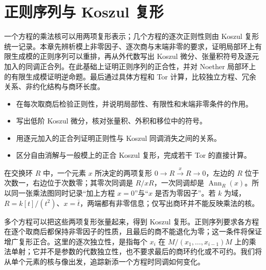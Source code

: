 
\chapter{正则序列与 Koszul 复形}
\label{b3:ch:15}

\begin{chapterabstract}
	一个方程的乘法核可以用两项复形表示；几个方程的逐次正则性则由 Koszul 复形统一记录。本章先辨析模上非零因子、逐次商与末端非零的要求，证明局部环上有限生成模的正则序列可以重排，再从外代数写出 Koszul 微分、张量积符号及逐元加入的同调正合列。在此基础上证明正则序列的正合性，并对 Noether 局部环上的有限生成模证明逆命题。最后通过具体方程和 Tor 计算，比较独立方程、冗余关系、非约化结构与商环长度。
\end{chapterabstract}

\begin{learninggoals}
	\begin{itemize}
		\item 在每次取商后检验正则性，并说明局部性、有限性和末端非零条件的作用。
		\item 写出低阶 Koszul 微分，核对张量积、外积和移位中的符号。
		\item 用逐元加入的正合列证明正则性与 Koszul 同调消失之间的关系。
		\item 区分自由消解与一般模上的正合 Koszul 复形，完成若干 Tor 的直接计算。
	\end{itemize}
\end{learninggoals}

在交换环 \(R\) 中，一个元素 \(x\) 所决定的两项复形 \(0\to R\xrightarrow{\,x\,}R\to0\)，左边的 \(R\) 位于次数一，右边位于次数零；其零次同调是 \(R/xR\)，一次同调却是 \(\operatorname{Ann}_R(x)\)。所以同一张乘法图同时记录“加上方程 \(x=0\)”与“\(x\) 是否为零因子”。若 \(k\) 为域，\(R=k[t]/(t^2)\)、\(x=\bar t\)，两端都有非零信息；仅写出商环并不能反映乘法的核。

\ProseParagraphBreak

多个方程可以把这些两项复形张量起来，得到 Koszul 复形。正则序列要求各方程在逐个取商后都保持非零因子的性质，且最后的商不能退化为零；这一条件将保证增广复形正合。这里的逐次独立性，是指每个 \(x_i\) 在 \(M/(x_1,\ldots,x_{i-1})M\) 上的乘法单射；它并不是参数的代数独立性，也不要求最后的商环约化或不可约。我们将从单个元素的核与像出发，追踪新添一个方程时同调如何变化。

